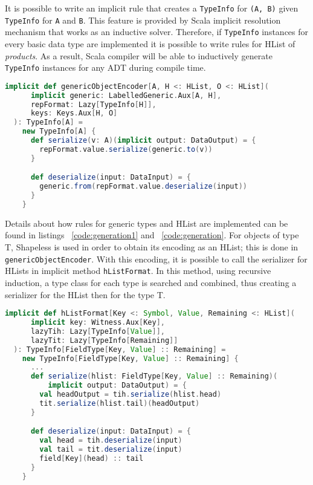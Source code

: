 It is possible to write an implicit rule that creates a
\lstinline[columns=fixed]{TypeInfo} for \lstinline[columns=fixed]{(A, B)} given
\lstinline[columns=fixed]{TypeInfo} for \lstinline[columns=fixed]{A} and
\lstinline[columns=fixed]{B}. This feature is provided by Scala implicit
resolution mechanism that works as an inductive solver. Therefore, if
\lstinline[columns=fixed]{TypeInfo} instances for every basic data type are
implemented it is possible to write rules for \acs{HList} of
\textit{products}. As a result, Scala compiler will be able to inductively
generate \lstinline[columns=fixed]{TypeInfo} instances for any \acs{ADT}
during compile time.

\begin{lstlisting}[language=scala, frame=trBL, label=code:generation1, float=ht, caption = {Serializer-Deserializer typeclass using parametric polymorphism}]
  implicit def genericObjectEncoder[A, H <: HList, O <: HList](
      implicit generic: LabelledGeneric.Aux[A, H],
      repFormat: Lazy[TypeInfo[H]],
      keys: Keys.Aux[H, O]
  ): TypeInfo[A] =
    new TypeInfo[A] {
      def serialize(v: A)(implicit output: DataOutput) = {
        repFormat.value.serialize(generic.to(v))
      }

      def deserialize(input: DataInput) = {
        generic.from(repFormat.value.deserialize(input))
      }
    }
\end{lstlisting}

Details about how rules for generic types and \acs{HList} are implemented can be
found in listings ~\ref{code:generation1} and ~\ref{code:generation}. For
objects of type T, Shapeless is used in order to obtain its encoding as an
\acs{HList}; this is done in \lstinline[columns=fixed]{genericObjectEncoder}.
With this encoding, it is possible to call the serializer for \acs{HList}s in
implicit method \lstinline[columns=fixed]{hListFormat}. In this method, using
recursive induction, a type class for each type is searched and combined, thus
creating a serializer for the \acs{HList} then for the type T.

\begin{lstlisting}[language=scala, frame=trBL, label=code:generation, float=ht, caption = {Serializer-Deserializer typeclass for \acs{HList}}]
  implicit def hListFormat[Key <: Symbol, Value, Remaining <: HList](
      implicit key: Witness.Aux[Key],
      lazyTih: Lazy[TypeInfo[Value]],
      lazyTit: Lazy[TypeInfo[Remaining]]
  ): TypeInfo[FieldType[Key, Value] :: Remaining] =
    new TypeInfo[FieldType[Key, Value] :: Remaining] {
      ...
      def serialize(hlist: FieldType[Key, Value] :: Remaining)(
          implicit output: DataOutput) = {
        val headOutput = tih.serialize(hlist.head)
        tit.serialize(hlist.tail)(headOutput)
      }

      def deserialize(input: DataInput) = {
        val head = tih.deserialize(input)
        val tail = tit.deserialize(input)
        field[Key](head) :: tail
      }
    }
\end{lstlisting}

